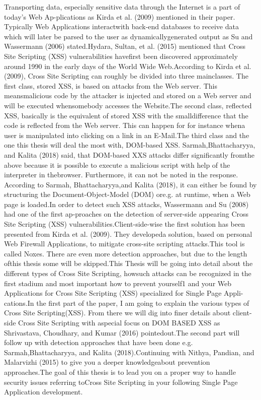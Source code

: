 Transporting data, especially sensitive data through the Internet is a part of today’s Web Ap-plications as Kirda et al. (2009) mentioned in their paper.  Typically Web Applications interactwith back-end databases to receive data which will later be parsed to the user as dynamicallygenerated output as Su and Wassermann (2006) stated.Hydara, Sultan, et al. (2015) mentioned that Cross Site Scripting (XSS) vulnerabilities havefirst been discovered approximately around 1990 in the early days of the World Wide Web.According to Kirda et al. (2009), Cross Site Scripting can roughly be divided into three mainclasses.   The  first  class,  stored  XSS,  is  based  on  attacks  from  the  Web  server.   This  meansmalicious code by the attacker is injected and stored on a Web server and will be executed whensomebody accesses the Website.The second class, reflected XSS, basically is the equivalent of stored XSS with the smalldifference that the code is reflected from the Web server. This can happen for for instance whena user is manipulated into clicking on a link in an E-Mail.The third class and the one this thesis will deal the most with, DOM-based XSS. Sarmah,Bhattacharyya, and Kalita (2018) said, that DOM-based XXS attacks differ significantly fromthe above because it is possible to execute a malicious script with help of the interpreter in thebrowser. Furthermore, it can not be noted in the response. According to Sarmah, Bhattacharyya,and Kalita (2018), it can either be found by structuring the Document-Object-Model (DOM) ore.g. at runtime, when a Web page is loaded.In order to detect such XSS attacks,  Wassermann and Su (2008) had one of the first ap-proaches on the detection of server-side appearing Cross Site Scripting (XSS) vulnerabilities.Client-side-wise the first solution has been presented from Kirda et al. (2009). They developeda solution, based on personal Web Firewall Applications, to mitigate cross-site scripting attacks.This tool is called Noxes.  There are even more detection approaches, but due to the length ofthis thesis some will be skipped.This Thesis will be going into detail about the different types of Cross Site Scripting, howsuch attacks can be recognized in the first stadium and most important how to prevent yourself1
and your Web Applications for Cross Site Scripting (XSS) specialized for Single Page Appli-cations.In the first part of the paper, I am going to explain the various types of Cross Site Scripting(XSS). From there we will dig into finer details about client-side Cross Site Scripting with aspecial focus on DOM BASED XSS as Shrivastava,  Choudhary,  and Kumar (2016) pointedout.The second part will follow up with detection approaches that have been done e.g. Sarmah,Bhattacharyya, and Kalita (2018).Continuing with Nithya, Pandian, and Malarvizhi (2015) to give you a deeper knowledgeabout prevention approaches.The goal of this thesis is to lead you on a proper way to handle security issues referring toCross Site Scripting in your following Single Page Application development.